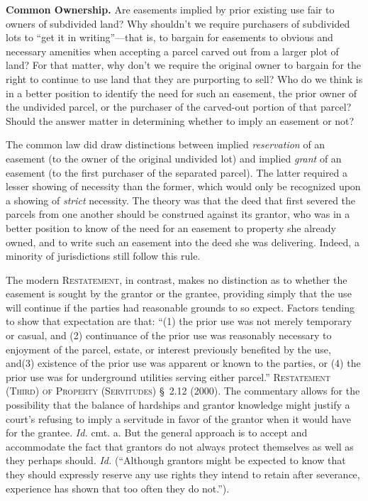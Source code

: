 
\item \textbf{Common Ownership.} Are easements implied by prior existing use
fair to owners of subdivided land? Why shouldn't we require purchasers of
subdivided lots to ``get it in writing''---that is, to bargain for easements to
obvious and necessary amenities when accepting a parcel carved out from a larger
plot of land? For that matter, why don't we require the original owner to
bargain for the right to continue to use land that they are purporting to sell?
Who do we think is in a better position to identify the need for such an
easement, the prior owner of the undivided parcel, or the purchaser of the
carved-out portion of that parcel? Should the answer matter in determining
whether to imply an easement or not?

The common law did draw distinctions between implied \textit{reservation} of an
easement (to the owner of the original undivided lot) and implied \textit{grant}
of an easement (to the first purchaser of the separated parcel). The latter
required a lesser showing of necessity than the former, which would only be
recognized upon a showing of \textit{strict} necessity. The theory was that the
deed that first severed the parcels from one another should be construed against
its grantor, who was in a better position to know of the need for an easement to
property she already owned, and to write such an easement into the deed she was
delivering. Indeed, a minority of jurisdictions still follow this rule.

The modern \textsc{Restatement}, in contrast, makes no distinction as to whether
the
easement is sought by the grantor or the grantee, providing simply that the use
will continue if the parties had reasonable grounds to so expect. Factors
tending to show that expectation are that: ``(1) the prior use was not merely
temporary or casual, and (2) continuance of the prior use was reasonably
necessary to enjoyment of the parcel, estate, or interest previously benefited
by the use, and(3) existence of the prior use was apparent or known to the
parties, or (4) the prior use was for underground utilities serving either
parcel.'' \textsc{Restatement (Third) of Property (Servitudes)} \S~2.12 (2000).
The commentary allows for the possibility that the balance of hardships and
grantor knowledge might justify a court's refusing to imply a servitude in favor
of the grantor when it would have for the grantee. \textit{Id.} cmt. a. But the
general approach is to accept and accommodate the fact that grantors do not
always protect themselves as well as they perhaps should. \textit{Id.}
(``Although grantors might be expected to know that they should expressly
reserve any use rights they intend to retain after severance, experience has
shown that too often they do not.''). 

